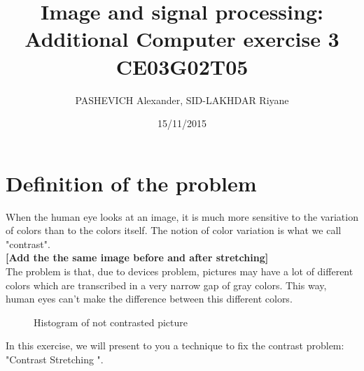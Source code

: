 \documentclass[a4paper]{article}
\title{Image and signal processing: Additional Computer exercise 3\\CE03G02T05}
\author{PASHEVICH Alexander, SID-LAKHDAR Riyane}
\date{15/11/2015}
\begin{document}
\maketitle

\section{Definition of the problem}
When the human eye looks at an image, it is much more sensitive to the variation of colors than to the colors itself.   The notion of color variation is what we call "contrast".\\
\textbf{[Add the the same image before and after stretching]}\\

The problem is that, due to devices problem, pictures may have a lot of different colors which are transcribed in a very narrow gap of gray colors.   This way, human eyes can't make the difference between this different colors.\\
            \begin{figure}[!htb]\centering
                \begin{minipage}{0.45\textwidth}  \end{minipage}
                \caption{Histogram of not contrasted picture}
			\end{figure}

In this exercise, we will present to you a technique to fix the contrast problem: "Contrast Stretching ".
\end{document}
